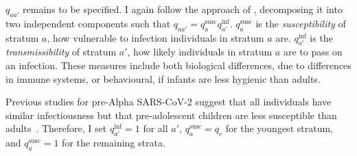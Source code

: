 \documentclass[thesis.tex]{subfiles}
\begin{document}

$q_{aa'}$ remains to be specified.
I again follow the approach of \textcite{birrellRealtime}, decomposing it into two independent components such that $q_{aa'} = q^\text{susc}_{a} q^\text{inf}_{a'}$.
$q^\text{susc}_a$ is the \emph{susceptibility} of stratum $a$, \ie how vulnerable to infection individuals in stratum $a$ are.
$q^\text{inf}_{a'}$ is the \emph{transmissibility} of stratum $a'$, \ie how likely individuals in stratum $a$ are to pass on an infection.
These measures include both biological differences, \eg due to differences in immune systems, or behavioural, \eg if infants are less hygienic than adults.


Previous studies for pre-Alpha SARS-CoV-2 suggest that all individuals have similar infectiousness but that pre-adolescent children are less susceptible than adults~\autocites{chenRole}{vinerTransmission}.
Therefore, I set $q^\text{inf}_{a'} = 1$ for all $a'$, $q^\text{susc}_{a} = q_c$ for the youngest stratum, and $q^\text{susc}_{a} = 1$ for the remaining strata.
\end{document}

